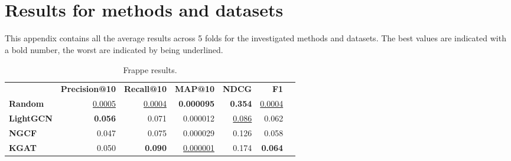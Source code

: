 \section{\\Results for methods and datasets}\label{app:tables}
This appendix contains all the average results across 5 folds for the investigated methods and datasets.
The best values are indicated with a bold number, the worst are indicated by being underlined.


\begin{table}[!htp]\centering
\caption{Frappe results.}\label{tab:frappetable}
\scriptsize
\begin{tabular}{lrrrrrr}\toprule
&\textbf{Precision@10} &\textbf{Recall@10} &\textbf{MAP@10} &\textbf{NDCG} &\textbf{F1} \\\cmidrule{2-6}
\textbf{Random} &\ul{0.0005} &\ul{0.0004} &\textbf{0.000095} &\textbf{0.354} &\ul{0.0004} \\\cmidrule{1-6}
\textbf{LightGCN} &\textbf{0.056} &0.071 &0.000012 &\ul{0.086} &0.062 \\\cmidrule{1-6}
\textbf{NGCF} &0.047 &0.075 &0.000029 &0.126 &0.058 \\\midrule
\textbf{KGAT} &0.050 &\textbf{0.090} &\ul{0.000001} &0.174 &\textbf{0.064} \\
\bottomrule
\end{tabular}
\end{table}


